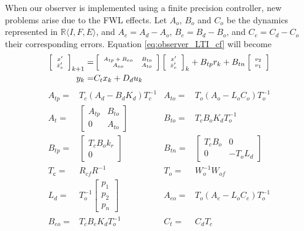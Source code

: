\documentclass[twocolumn]{autart}    %
\newcommand{\mat}[1]{{#1}}
\renewcommand{\vec}[1]{{#1}}
\begin{document}
{When our observer is implemented using a finite precision controller, new
problems arise due to the FWL effects.  Let $\mat{A}_o$, $\mat{B}_o$ and
$\mat{C}_o$ be the dynamics represented in $\mathbb{R} \langle I , F, E
\rangle$, and $\mat{A}_e=\mat{A}_d-\mat{A}_o$,
$\mat{B}_e=\mat{B}_d-\mat{B}_o$, and $\mat{C}_e=\mat{C}_d-\mat{C}_o$ their
corresponding errors.  Equation \eqref{eq:observer_LTI_cf} will become
%
\begin{align}
\tiny
\left [\begin{array}{c}\vec{x}'\\ \hat{\vec{x}}_e' \end{array}\right]_{k+1}
=&\tiny \left [\begin{array}{cc}\mat{A}_{tp}+\mat{B}_{eo}&\mat{B}_{to}\\ \mat{A}_{eo}&\mat{A}_{to}\end{array}\right]
\left [\begin{array}{c}\vec{x}'\\ \hat{\vec{x}}_e' \end{array}\right]_k
+\mat{B}_{tp} \vec{r}_k
+\mat{B}_{tn}\left [\begin{array}{c}\vec{\nu}_2\\ \vec{\nu}_1\end{array}\right]\nonumber\\
\tiny\vec{y}_k=&\tiny\mat{C}_{t}\vec{x}_k + \mat{D}_{d}\vec{u}_k
\label{eq:observer_LTI_FWL_cf}
\end{align}
\begin{align*}
\mat{A}_{tp}=&\mat{T}_c\left(\mat{A}_d-\mat{B}_d\mat{K}_d\right)\mat{T}_c^{-1}&
\mat{A}_{to}=&\mat{T}_o\left(\mat{A}_o-\mat{L}_o\mat{C}_o\right)\mat{T}_o^{-1}\\
\mat{A}_t=&\left [\begin{array}{cc}\mat{A}_{tp}&\mat{B}_{to}\\ \mat{0}&\mat{A}_{to}\end{array}\right]&
\mat{B}_{to}=&\mat{T}_c\mat{B}_o\mat{K}_d\mat{T}_o^{-1}\\
\mat{B}_{tp}=&\left[\begin{array}{c}\mat{T}_c\mat{B}_o\mat{k}_r\\\mat{0}\end{array}\right]&
\mat{B}_{tn}=&\left[\begin{array}{cc}\mat{T}_c\mat{B}_o&\mat{0}\\\mat{0}&-\mat{T}_o\mat{L}_d\end{array}\right]\\
\mat{T}_с=&\mat{R}_{cf}\mat{R}^{-1}&
\mat{T}_o=&\mat{W}_o^{-1}\mat{W}_{of}\\
\mat{L}_d=& \mat{T}_o^{-1}\left[ \begin{array}{c}p_1\\p_2\\p_n\end{array}\right]&
\mat{A}_{eo}=&\mat{T}_o\left(\mat{A}_e-\mat{L}_o\mat{C}_e\right)\mat{T}_o^{-1}\\
\mat{B}_{eo}=&\mat{T}_c\mat{B}_e\mat{K}_d\mat{T}_o^{-1}&
\mat{C}_t=&\mat{C}_d\mat{T}_c
\end{align*}

}
\end{document}
